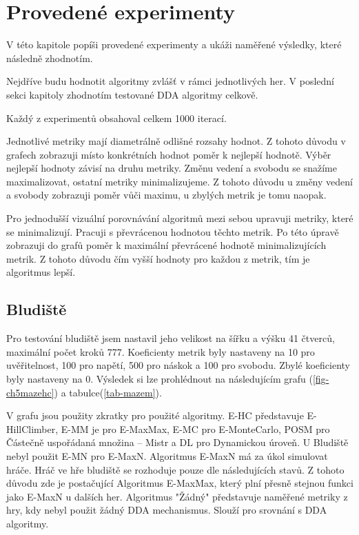 \chapter{Provedené experimenty}

V této kapitole popíši provedené experimenty a ukáži naměřené výsledky, které následně zhodnotím.

Nejdříve budu hodnotit algoritmy zvlášť v rámci jednotlivých her. V poslední sekci kapitoly zhodnotím testované DDA algoritmy celkově.

Každý z experimentů obsahoval celkem 1000 iterací.

Jednotlivé metriky mají diametrálně odlišné rozsahy hodnot. Z tohoto důvodu v grafech zobrazuji místo konkrétních hodnot poměr k nejlepší hodnotě. Výběr nejlepší hodnoty závisí na druhu metriky. Změnu vedení a svobodu se snažíme maximalizovat, ostatní metriky minimalizujeme. Z tohoto důvodu u změny vedení a svobody zobrazuji poměr vůči maximu, u zbylých metrik je tomu naopak.

Pro jednodušší vizuální porovnávání algoritmů mezi sebou upravuji metriky, které se minimalizují. Pracuji s převrácenou hodnotou těchto metrik. Po této úpravě zobrazuji do grafů poměr k maximální převrácené hodnotě minimalizujících metrik. Z tohoto důvodu čím vyšší hodnoty pro každou z metrik, tím je algoritmus lepší.

\section{Bludiště}

Pro testování bludiště jsem nastavil jeho velikost na šířku a výšku 41 čtverců, maximální počet kroků 777. Koeficienty metrik byly nastaveny na 10 pro uvěřitelnost, 100 pro napětí, 500 pro náskok a 100 pro svobodu. Zbylé koeficienty byly nastaveny na 0. Výsledek si lze prohlédnout na následujícím grafu (\ref{fig-ch5mazehc}) a tabulce(\ref{tab-mazem}).

V grafu jsou použity zkratky pro použité algoritmy. E-HC představuje E-HillClimber, E-MM je pro E-MaxMax, E-MC pro E-MonteCarlo, POSM pro Částečně uspořádaná množina – Mistr a DL pro Dynamickou úroveň. U Bludiště nebyl použit E-MN pro E-MaxN. Algoritmus E-MaxN má za úkol simulovat hráče. Hráč ve hře bludiště se rozhoduje pouze dle následujících stavů. Z tohoto důvodu zde je postačující Algoritmus E-MaxMax, který plní přesně stejnou funkci jako E-MaxN u dalších her. Algoritmus "Žádný" představuje naměřené metriky z hry, kdy nebyl použit žádný DDA mechanismus. Slouží pro srovnání s DDA algoritmy.

